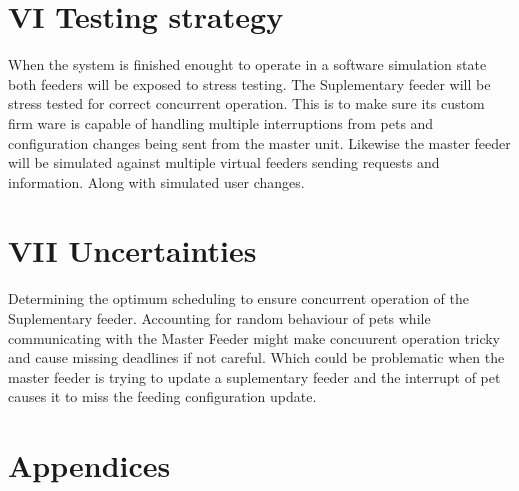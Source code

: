 \documentclass[12pt]{article}
\begin{document}
\section{VI Testing strategy}
When the system is finished enought to operate in a software simulation state both feeders will be exposed 
to stress testing.  The Suplementary feeder will be stress tested for correct concurrent operation.  
This is to make sure its custom firm ware is capable of handling multiple interruptions from pets and configuration
changes being sent from the master unit. Likewise the master feeder will be simulated against multiple virtual 
feeders sending requests and information. Along with simulated user changes. 


\section{VII Uncertainties}
Determining the optimum scheduling to ensure concurrent operation of the Suplementary feeder.  
Accounting for random behaviour of pets while communicating with the Master Feeder might 
make concuurent operation tricky and cause missing deadlines if not careful.  Which could be 
problematic when the master feeder is trying to update a suplementary feeder and the interrupt of pet
causes it to miss the feeding configuration update.  

\newpage
\section{Appendices}
\end{document}
